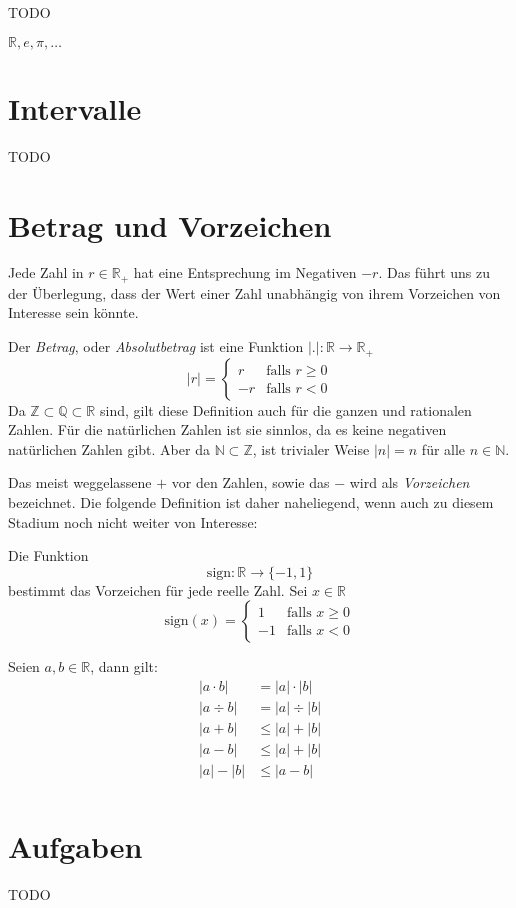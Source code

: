 TODO

$\mathbb{R}, e, \pi, \dots $

\section{Intervalle}

TODO

\section{Betrag und Vorzeichen}

Jede Zahl in $r\in \mathbb{R}_+$ hat eine Entsprechung im Negativen $-r$. Das führt uns zu der Überlegung, dass der Wert einer Zahl unabhängig von ihrem Vorzeichen von Interesse sein könnte.

\begin{definition}
Der \textsl{Betrag}, oder \textsl{Absolutbetrag} ist eine Funktion $\vert . \vert : \mathbb{R} \longrightarrow \mathbb{R}_+$
\begin{equation}
\vert r \vert = \begin{cases}
r & \text{falls } r\ge 0 \\
-r & \text{falls } r<0
\end{cases}
\end{equation}
Da $\mathbb{Z} \subset \mathbb{Q} \subset \mathbb{R}$ sind, gilt diese Definition auch für die ganzen und rationalen Zahlen. Für die natürlichen Zahlen ist sie sinnlos, da es keine negativen natürlichen Zahlen gibt. Aber da $\mathbb{N} \subset \mathbb{Z}$, ist trivialer Weise $\vert n \vert = n$ für alle $n\in \mathbb{N}$.
\end{definition}

Das meist weggelassene $+$ vor den Zahlen, sowie das $-$ wird als \textsl{Vorzeichen} bezeichnet. Die folgende Definition ist daher naheliegend, wenn auch zu diesem Stadium noch nicht weiter von Interesse:

\begin{definition}
Die Funktion 
\[
\text{sign} : \mathbb{R} \longrightarrow \lbrace -1,1\rbrace
\]
bestimmt das Vorzeichen für jede reelle Zahl. Sei $x \in \mathbb{R}$
\begin{equation}
\text{sign}(x) = \begin{cases}
1 & \text{falls } x\ge 0 \\
-1 & \text{falls } x < 0
\end{cases}
\end{equation}
\end{definition}
Seien $a,b\in \mathbb{R}$, dann gilt:
\begin{equation}
\begin{split}
|a\cdot b| &= |a|\cdot |b| \\
|a\div b| &= |a|\div |b| \\
|a+b| &\le |a|+|b| \\
|a-b| &\le |a|+|b| \\
|a|-|b| &\le |a-b| \\
\end{split}
\end{equation}


\section{Aufgaben}
TODO
